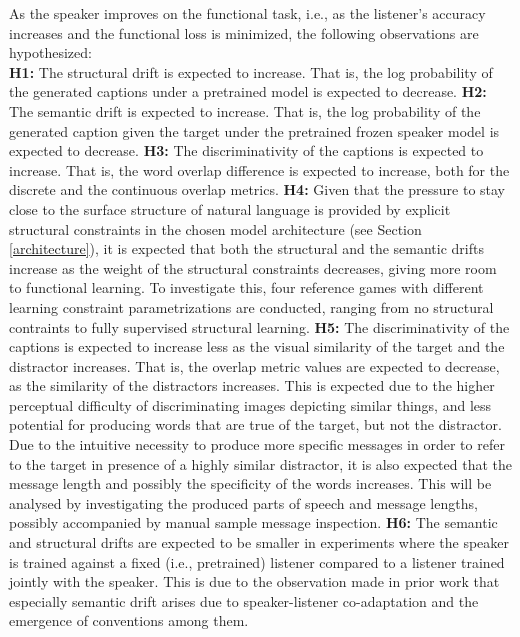 As the speaker improves on the functional task, i.e., as the listener's accuracy increases and the functional loss is minimized, the following observations are hypothesized: \\
\newline 
\textbf{H1:} The structural drift is expected to increase. That is, the log probability of the generated captions under a pretrained model is expected to decrease. \newline
\textbf{H2:} The semantic drift is expected to increase. That is, the log probability of the generated caption given the target under the pretrained frozen speaker model is expected to decrease. \newline
\textbf{H3:} The discriminativity of the captions is expected to increase. That is, the word overlap difference is expected to increase, both for the discrete and the continuous overlap metrics. \newline
\textbf{H4:} Given that the pressure to stay close to the surface structure of natural language is provided by explicit structural constraints in the chosen model architecture (see Section \ref{architecture}), it is expected that both the structural and the semantic drifts increase as the weight of the structural constraints decreases, giving more room to functional learning. To investigate this, four reference games with different learning constraint parametrizations are conducted, ranging from no structural contraints to fully supervised structural learning. \newline
\textbf{H5:} The discriminativity of the captions is expected to increase less as the visual similarity of the target and the distractor increases. That is, the overlap metric values are expected to decrease, as the similarity of the distractors increases. This is expected due to the higher perceptual difficulty of discriminating images depicting similar things, and less potential for producing words that are true of the target, but not the distractor. Due to the intuitive necessity to produce more specific messages in order to refer to the target in presence of a highly similar distractor, it is also expected that the message length and possibly the specificity of the words increases. This will be analysed by investigating the produced parts of speech and message lengths, possibly accompanied by manual sample message inspection.\newline
\textbf{H6:}  The semantic and structural drifts are expected to be smaller in experiments where the speaker is trained against a fixed (i.e., pretrained) listener compared to a listener trained jointly with the speaker. This is due to the observation made in prior work that especially semantic drift arises due to speaker-listener co-adaptation and the emergence of conventions among them. \newline

